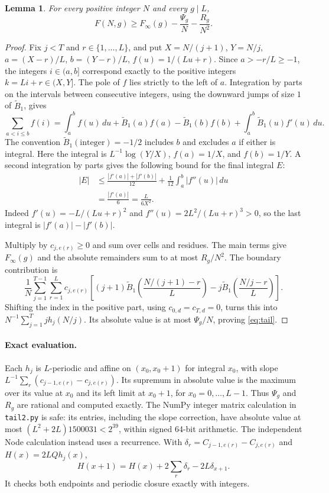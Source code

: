 \documentclass[10pt]{article}
\newtheorem{lemma}[theorem]{Lemma}
\theoremstyle{remark}
\newcommand{\B}{\widetilde B}
\begin{document}
\begin{lemma}\label{lem:tail}
For every positive integer $N$ and every $g\mid L$,
\begin{equation}\label{eq:tail}
 F(N,g)\ge F_\infty(g)-\frac{\Psi_g}{N}-\frac{R_g}{N^2}.
\end{equation}
\end{lemma}
\begin{proof}
Fix $j<T$ and $r\in\{1,\ldots,L\}$, and put
$X=N/(j+1)$, $Y=N/j$, $a=(X-r)/L$, $b=(Y-r)/L$,
$f(u)=1/(Lu+r)$. Since $a>-r/L\ge-1$, the integers $i\in(a,b]$
correspond exactly to the positive integers $k=Li+r\in(X,Y]$.
The pole of $f$ lies strictly to the left of $a$.
Integration by parts on the intervals between consecutive integers,
using the downward jumps of size $1$ of $\B_1$, gives
\[
 \sum_{a<i\le b}f(i)=\int_a^b f(u)\,du
 +\B_1(a)f(a)-\B_1(b)f(b)+\int_a^b\B_1(u)f'(u)\,du.
\]
The convention $\B_1(\text{integer})=-1/2$ includes $b$ and excludes
$a$ if either is integral. Here the integral is $L^{-1}\log(Y/X)$,
$f(a)=1/X$, and $f(b)=1/Y$. A second integration by parts gives the
following bound for the final integral $E$:
\begin{align*}
 |E|&\le\frac{|f'(a)|+|f'(b)|}{12}
       +\frac1{12}\int_a^b|f''(u)|\,du\\
 &=\frac{|f'(a)|}{6}=\frac{L}{6X^2}.
\end{align*}
Indeed $f'(u)=-L/(Lu+r)^2$ and $f''(u)=2L^2/(Lu+r)^3>0$, so the
last integral is $|f'(a)|-|f'(b)|$.

Multiply by $c_{j,e(r)}\ge0$ and sum over cells and residues. The
main terms give $F_\infty(g)$ and the absolute remainders sum to at
most $R_g/N^2$. The boundary contribution is
\[
 \frac1N\sum_{j=1}^{T-1}\sum_{r=1}^L c_{j,e(r)}
 \left[(j+1)\B_1\left(\frac{N/(j+1)-r}{L}\right)
       -j\B_1\left(\frac{N/j-r}{L}\right)\right].
\]
Shifting the index in the positive part, using $c_{0,d}=c_{T,d}=0$,
turns this into $N^{-1}\sum_{j=1}^T jh_j(N/j)$. Its absolute value
is at most $\Psi_g/N$, proving \eqref{eq:tail}.
\end{proof}

\paragraph{Exact evaluation.}
Each $h_j$ is $L$-periodic and affine on $(x_0,x_0+1)$ for integral
$x_0$, with slope $L^{-1}\sum_r(c_{j-1,e(r)}-c_{j,e(r)})$.
Its supremum in absolute value is the maximum over its value at $x_0$
and its left limit at $x_0+1$, for $x_0=0,\ldots,L-1$.
Thus $\Psi_g$ and $R_g$ are rational and computed exactly.
The NumPy integer matrix calculation in \texttt{tail2.py} is safe:
its entries, including the slope correction, have absolute value at
most $(L^2+2L)1500031<2^{39}$, within signed 64-bit arithmetic.
The independent Node calculation instead uses a recurrence. With
$\delta_r=C_{j-1,e(r)}-C_{j,e(r)}$ and $H(x)=2LQh_j(x)$,
\[
 H(x+1)=H(x)+2\sum_r\delta_r-2L\delta_{x+1}.
\]
It checks both endpoints and periodic closure exactly with integers.
\end{document}
